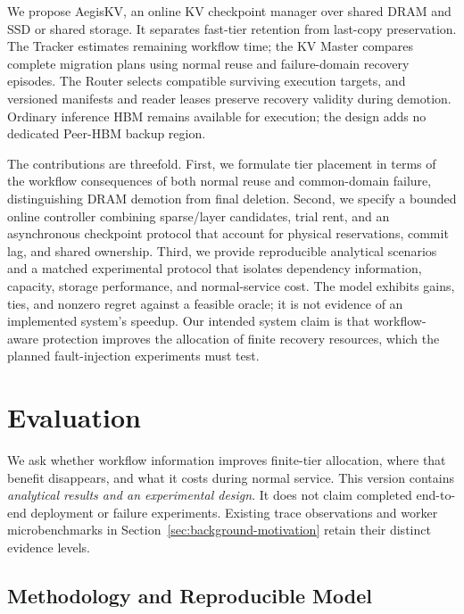 \documentclass[sigplan,10pt,anonymous,nonacm]{acmart}
\begin{document}
We propose AegisKV, an online KV checkpoint manager over shared DRAM and
SSD or shared storage. It separates fast-tier retention from last-copy
preservation. The Tracker estimates remaining workflow time; the KV Master
compares complete migration plans using normal reuse and failure-domain
recovery episodes. The Router selects compatible surviving execution
targets, and versioned manifests and reader leases preserve recovery
validity during demotion. Ordinary inference HBM remains available for
execution; the design adds no dedicated Peer-HBM backup region.

The contributions are threefold. First, we formulate tier placement in
terms of the workflow consequences of both normal reuse and common-domain
failure, distinguishing DRAM demotion from final deletion. Second, we
specify a bounded online controller combining sparse/layer candidates,
trial rent, and an asynchronous checkpoint protocol
that account for physical reservations, commit lag, and shared ownership.
Third, we provide reproducible analytical scenarios and a matched
experimental protocol that isolates dependency information, capacity,
storage performance, and normal-service cost. The model exhibits gains,
ties, and nonzero regret against a feasible oracle; it is not evidence of
an implemented system's speedup. Our intended system claim is that
workflow-aware protection improves the allocation of finite recovery
resources, which the planned fault-injection experiments must test.




\section{Evaluation}
\label{sec:evaluation}

We ask whether workflow information improves finite-tier allocation,
where that benefit disappears, and what it costs during normal service.
This version contains \emph{analytical results and an experimental design}.
It does not claim completed end-to-end deployment or failure experiments.
Existing trace observations and worker microbenchmarks in
Section~\ref{sec:background-motivation} retain their distinct evidence levels.

\subsection{Methodology and Reproducible Model}
\label{sec:eval-method}
\end{document}
